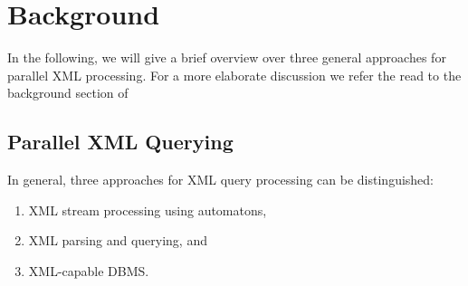 \section{Background}\label{sec:background}
In the following, we will give a brief overview over three general approaches
for parallel XML processing. For a more elaborate discussion we refer the read
to the background section of

\subsection{Parallel XML Querying}
In general, three approaches for XML query processing can be distinguished:

\begin{enumerate}
\item XML stream processing using automatons,
\item XML parsing and querying, and
\item XML-capable DBMS.
\end{enumerate}







